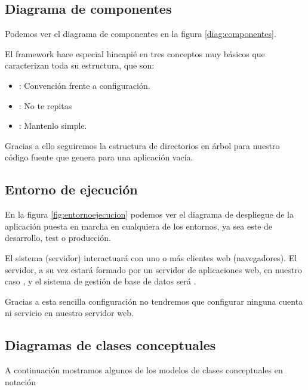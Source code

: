 \subsection{Diagrama de componentes}
Podemos ver el diagrama de componentes en la figura \ref{diag:componentes}.


El framework  hace especial hincapié en tres conceptos
muy básicos que caracterizan toda su estructura, que son:

\begin{itemize}
\item {}: Convención frente a
  configuración.
\item {}: No te repitas
\item {}: Mantenlo simple.
\end{itemize}

Gracias a ello seguiremos la estructura de directorios en árbol para nuestro
código fuente que genera  para una aplicación vacía.
\subsection{Entorno de ejecución}
En la figura \ref{fig:entornoejecucion} podemos ver el diagrama de despliegue de
la aplicación puesta en marcha en cualquiera de los entornos, ya sea este de
desarrollo, test o producción.

El sistema (servidor) interactuará con uno o más clientes web (navegadores). El
servidor, a su vez estará formado por un servidor de aplicaciones web, en
nuestro caso , y el sistema de gestión de base de datos será
.

Gracias a esta sencilla configuración no tendremos que configurar ninguna cuenta
ni servicio en nuestro servidor web.
\subsection{Diagramas de clases conceptuales}
A continuación mostramos algunos de los modelos de clases conceptuales en
notación  \cite{uml:distilled_standard}

\clearpage


